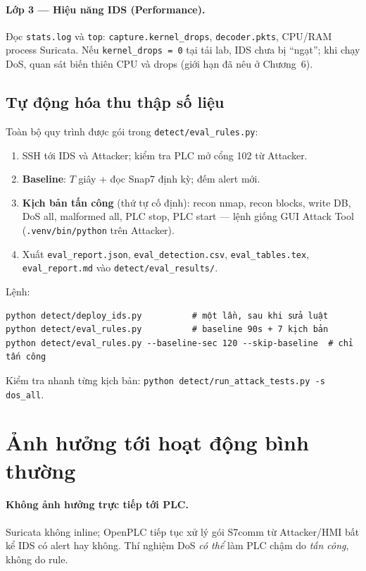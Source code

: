 \documentclass[../main.tex]{subfiles}
\begin{document}
\paragraph{Lớp 3 — Hiệu năng IDS (Performance).}
Đọc \texttt{stats.log} và \texttt{top}: \texttt{capture.kernel\_drops}, \texttt{decoder.pkts}, CPU/RAM process Suricata. Nếu \texttt{kernel\_drops = 0} tại tải lab, IDS chưa bị ``ngạt''; khi chạy DoS, quan sát biến thiên CPU và drops (giới hạn đã nêu ở Chương~6).

\subsection{Tự động hóa thu thập số liệu}

Toàn bộ quy trình được gói trong \texttt{detect/eval\_rules.py}:
\begin{enumerate}
    \item SSH tới IDS và Attacker; kiểm tra PLC mở cổng 102 từ Attacker.
    \item \textbf{Baseline}: $T$ giây + đọc Snap7 định kỳ; đếm alert mới.
    \item \textbf{Kịch bản tấn công} (thứ tự cố định): recon nmap, recon blocks, write DB, DoS all, malformed all, PLC stop, PLC start --- lệnh giống GUI Attack Tool (\texttt{.venv/bin/python} trên Attacker).
    \item Xuất \texttt{eval\_report.json}, \texttt{eval\_detection.csv}, \texttt{eval\_tables.tex}, \texttt{eval\_report.md} vào \texttt{detect/eval\_results/}.
\end{enumerate}

Lệnh:
\begin{verbatim}
python detect/deploy_ids.py          # một lần, sau khi sửa luật
python detect/eval_rules.py          # baseline 90s + 7 kịch bản
python detect/eval_rules.py --baseline-sec 120 --skip-baseline  # chỉ tấn công
\end{verbatim}

Kiểm tra nhanh từng kịch bản: \texttt{python detect/run\_attack\_tests.py -s dos\_all}.

\section{Ảnh hưởng tới hoạt động bình thường}
\label{sec:eval-normal-impact}

\paragraph{Không ảnh hưởng trực tiếp tới PLC.}
Suricata không inline; OpenPLC tiếp tục xử lý gói S7comm từ Attacker/HMI bất kể IDS có alert hay không. Thí nghiệm DoS \emph{có thể} làm PLC chậm do \emph{tấn công}, không do rule.
\end{document}
